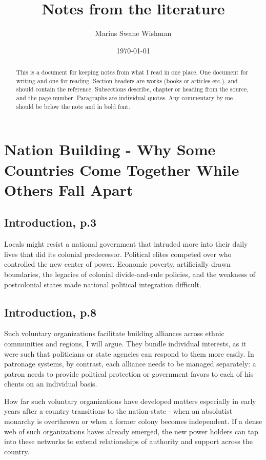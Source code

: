\documentclass[12pt]{article}
\title{Notes from the literature}
\author[1]{Marius Swane Wishman}
\affil[1]{Department of Sociology and Political Science, NTNU}
\date{\today}
\begin{document}
\maketitle

\begin{abstract}
	This is a document for keeping notes from what I read in one
	place.  One document for writing and one for reading.  Section headers are works
	(books or articles etc.), and should contain the reference.  Subsections
	describe, chapter or heading from the source, and the page number.  Paragraphs
	are individual quotes.  Any commentary by me should be below the note and in
	bold font. 
\end{abstract}

\pagebreak

\onehalfspacing
\section{Nation Building - Why Some Countries Come Together While Others Fall 
	Apart \citep{Wimmer_2018}}

\subsection{Introduction, p.3}

Locals might resist a national government that intruded more into their daily
lives that did its colonial predecessor.  Political elites competed over who
controlled the new center of power.  Economic poverty, artificially drawn
boundaries, the legacies of colonial divide-and-rule policies, and the weakness
of postcolonial states made national political integration difficult.

\subsection{Introduction, p.8}

Such voluntary organizations facilitate building alliances across ethnic
communities and regions, I will argue.  They bundle individual interests, as it
were such that politicians or state agencies can respond to them more easily.
In patronage systems, by contrast, each alliance needs to be managed separately:
a patron needs to provide political protection or government favors to each of
his clients on an individual basis.

\bigskip

How far such voluntary organizations have developed matters especially in early
years after a country transitions to the nation-state - when an absolutist
monarchy is overthrown or when a former colony becomes independent.  If a dense
web of such organizations haves already emerged, the new power holders can tap
into these networks to extend relationships of authority and support across the
country. 
\end{document}
